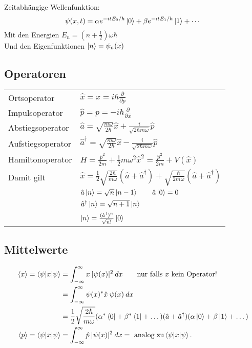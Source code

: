 \documentclass[landscape,8pt]{scrartcl}
\begin{document}
\begin{multicols}{3}

\noindent Zeitabhängige Wellenfunktion:
\[
	\psi(x,t)
		= \alpha e^{-itE_0/\hbar}\ket 0 
		+ \beta  e^{-itE_1/\hbar}\ket 1  
		+ \cdots
\]
Mit den Energien $E_n = \left(n+\frac 12\right) \omega \hbar $ \\
Und den Eigenfunktionen $\ket n = \psi_n(x)$\\

\subsection{Operatoren}
\begin{tabular}{ll}
Ortsoperator 			& $\hat x = x = i \hbar \frac{\partial}{\partial p}$	\\
Impulsoperator 			& $\hat p = p = -i\hbar \frac{\partial}{\partial x}$	\\
Abstiegsoperator 		& $\hat a = \sqrt{\frac{m \omega}{2\hbar}} \hat x + \frac{i}{\sqrt{2\hbar m \omega}} \hat p$	\\
Aufstiegsoperator 		& $\hat a^\dagger = \sqrt{\frac{m \omega}{2\hbar}} \hat x - \frac{i}{\sqrt{2\hbar m \omega}} \hat p$ \\
Hamiltonoperator		& $H=\frac{\hat p^2}{2m}+\frac{1}{2}m\omega^2\hat x^2 = \frac{\hat p^2}{2m} + V(\hat x)$	\\
Damit gilt				& $\hat x  = \frac 12 \sqrt{\frac{2\hbar}{m\omega}}(\hat a + \hat a^\dagger) + \sqrt{\frac{\hbar}{2m\omega}}(\hat a + \hat a^\dagger)$	\\
						& $\hat a\ket n = \sqrt{n}\ket{n-1} \qquad \hat a \ket 0 = 0$ \\
						& $\hat a^\dagger \ket n = \sqrt{n+1}\ket n$	\\
						& $\ket n = \frac{(\hat a^\dagger)^n}{\sqrt {n!}} \ket 0 $
\end{tabular}

\subsection{Mittelwerte}
\begin{align*}
\braket{x}=\braket{\psi|x|\psi}	&=\int_{-\infty}^{\infty} x\:|\psi(x)|^2\:dx\qquad\text{nur falls } x \text{ kein Operator!}\\
								&=\int_{-\infty}^{\infty} \psi(x)^\ast \hat x\:\psi(x)\:dx		\\
								&=\frac 12 \sqrt{\frac{2\hbar}{m\omega}}(\alpha^\ast \bra 0 + \beta^\ast \bra 1 + \dots) (\hat a + \hat a^\dagger) (\alpha \ket 0 + \beta \ket 1 + \dots) \\
\braket{p}=\braket{\psi|x|\psi}	&=\int_{-\infty}^{\infty} \hat p\:|\psi(x)|^2\:dx= \text{ analog zu}\braket{\psi|x|\psi}\text{.}	\\
\end{align*}



\end{multicols}
\end{document}
